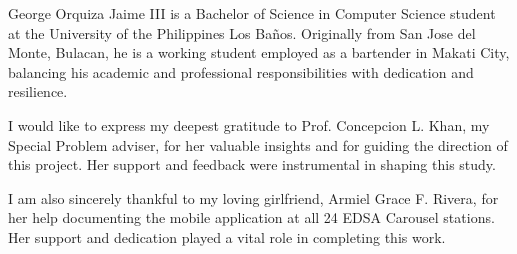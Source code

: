 \documentclass{icsthesis}
\renewcommand{\TITLE}{EDSAAN: A MOBILE NAVIGATION SYSTEM FOR THE EDSA CAROUSEL BUSWAY}
\renewcommand{\AUTHOR}{GEORGE ORQUIZA JAIME III}
\renewcommand{\DEGREE}{BACHELOR OF SCIENCE}
\renewcommand{\MAJOR}{Computer Science}
\begin{document}
	
	\begin{frontmatter}
		\maketitle
				
			
			
		
		\begin{biosketch}
George Orquiza Jaime III is a Bachelor of Science in Computer Science student at the University of the Philippines Los Baños. Originally from San Jose del Monte, Bulacan, he is a working student employed as a bartender in Makati City, balancing his academic and professional responsibilities with dedication and resilience.
					
			
			\addauthorsignaturefield
		\end{biosketch}	
		
		\begin{acknowledgement}
I would like to express my deepest gratitude to Prof. Concepcion L. Khan, my Special Problem adviser, for her valuable insights and for guiding the direction of this project. Her support and feedback were instrumental in shaping this study.

I am also sincerely thankful to my loving girlfriend, Armiel Grace F. Rivera, for her help documenting the mobile application at all 24 EDSA Carousel stations. Her support and dedication played a vital role in completing this work.


\end{acknowledgement}
\end{frontmatter}
\end{document}
